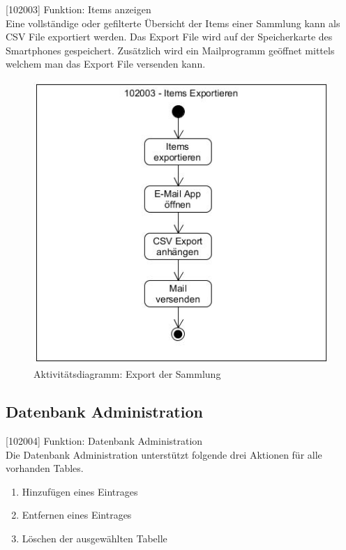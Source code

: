 [102003] Funktion: Items anzeigen\\

Eine vollständige oder gefilterte Übersicht der Items einer Sammlung kann als CSV File exportiert werden. Das Export File wird auf der Speicherkarte des Smartphones gespeichert. Zusätzlich wird ein Mailprogramm geöffnet mittels welchem man das Export File versenden kann.

\begin{figure}[htbp]
	\centering
	\includegraphics[scale=0.6]{pic/102003}
	\caption{Aktivitätsdiagramm: Export der Sammlung}
\end{figure}

\subsection{Datenbank Administration}

[102004] Funktion: Datenbank Administration\\

Die Datenbank Administration unterstützt folgende drei Aktionen für alle vorhanden Tables.

\begin{enumerate}
	\item Hinzufügen eines Eintrages
	\item Entfernen eines Eintrages
	\item Löschen der ausgewählten Tabelle
\end{enumerate}


